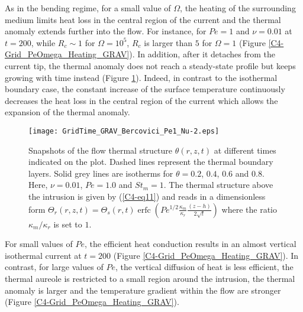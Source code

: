 As in the  bending regime, for a small value  of $\Omega$, the heating
of the  surrounding medium limits heat  loss in the central  region of
the current and the thermal anomaly extends further into the flow. For
instance, for $Pe=1$ and $\nu=0.01$  at $t=200$, while $R_c\sim 1$ for
$\Omega=10^5$,  $R_c$ is  larger than  $5$  for $\Omega  =1 $  (Figure
\ref{C4-Grid_PeOmega_Heating_GRAV}).  In  addition, after  it detaches
from  the  current   tip,  the  thermal  anomaly  does   not  reach  a
steady-state  profile  but keeps  growing  with  time instead  (Figure
\ref{C4-Grid_TIME_GRAV}).   Indeed,  in  contrast  to  the  isothermal
boundary  case,  the  constant  increase of  the  surface  temperature
continuously  decreases the  heat loss  in the  central region  of the
current which allows the expansion of the thermal anomaly.
\begin{figure}[h!]
  \begin{center}
    \graphicspath{ {/Users/thorey/Documents/These/Projet/Refroidissement/Skin_Model/Figure/Figure_Heating/} }
    \texttt{[image: GridTime\_GRAV\_Bercovici\_Pe1\_Nu-2.eps]}
    \caption{Snapshots of  the flow thermal  structure $\theta(r,z,t)$
      at  different  times  indicated   on  the  plot.   Dashed  lines
      represent  the thermal  boundary  layers. Solid  grey lines  are
      isotherms for  $\theta =  0.2$, $0.4$,  $0.6$ and  $0.8$.  Here,
      $\nu=0.01$, $Pe  =1.0$ and  $St_m =  1$.  The  thermal structure
      above the intrusion  is given by (\ref{C4-eq11}) and  reads in a
      dimensionless                                               form
      $\Theta_r(r,z,t)=\Theta_s(r,t)\operatorname{erfc}{\left(Pe^{1/2}\frac{\kappa_m}{\kappa_r}\frac{(z-h)}{2\sqrt{t}}\right)}$
      where the ratio $\kappa_m/\kappa_r$ is set to $1$.}
    \label{C4-Grid_TIME_GRAV}
  \end{center}
\end{figure}

For small values of $Pe$, the  efficient heat conduction results in an
almost    vertical    isothermal    current   at    $t=200$    (Figure
\ref{C4-Grid_PeOmega_Heating_GRAV}). In contrast,  for large values of
$Pe$, the  vertical diffusion of  heat is less efficient,  the thermal
aureole  is restricted  to a  small region  around the  intrusion, the
thermal anomaly is larger and the temperature gradient within the flow
are stronger (Figure \ref{C4-Grid_PeOmega_Heating_GRAV}).


